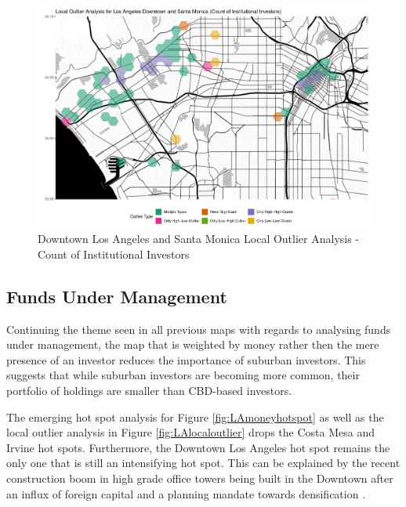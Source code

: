 \begin{figure}
	\centering
	\includegraphics[width=1\linewidth]{Figures/ChapterIV/LA_Count_LO_Downtown}
	\caption[Downtown Los Angeles and Santa Monica Local Outlier Analysis - Count of Institutional Investors 1999-2018]{Downtown Los Angeles and Santa Monica Local Outlier Analysis - Count of Institutional Investors}
	\label{fig:LAcountlocaloutliercount_Downtown}
\end{figure}	

\subsection{Funds Under Management}

Continuing the theme seen in all previous maps with regards to analysing funds under management, the map that is weighted by money rather then the mere presence of an investor reduces the importance of suburban investors.  This suggests that while suburban investors are becoming more common, their portfolio of holdings are smaller than CBD-based investors.  

The emerging hot spot analysis for Figure \ref{fig:LAmoneyhotspot} as well as the local outlier analysis in Figure \ref{fig:LAlocaloutlier} drops the Costa Mesa  and Irvine hot spots.  Furthermore, the Downtown Los Angeles hot spot remains the only one that is still an intensifying hot spot.  This can be explained by the recent construction boom in high grade office towers being built in the Downtown after an influx of foreign capital and a planning mandate towards densification \citep{Marino19}.  


